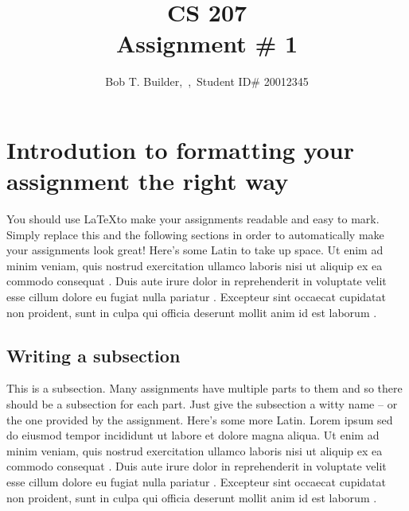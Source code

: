 \documentclass[journal,onecolumn]{IEEEtran}
\begin{document}


\newcommand{\course}{CS 207} %
\newcommand{\anum}{1} %
\newcommand{\name}{Bob T. Builder} %
\newcommand{\sid}{20012345} %


\title{\course{} \\ Assignment \# \anum{}}
\author{\name{},~\IEEEmembership{\course{},~University~of~Regina},~Student ID\# \sid{}}
\maketitle


\section{Introdution to formatting your assignment the right way}
You should use \LaTeX to make your assignments readable and easy to mark. Simply replace this and 
the following sections in order to automatically make your assignments look great! Here's some Latin to take up space. Ut enim ad minim veniam, quis nostrud exercitation ullamco laboris nisi ut aliquip ex ea commodo consequat \cite{kanto:kanto}. Duis aute irure dolor in reprehenderit in voluptate velit esse cillum dolore eu fugiat nulla pariatur \cite{monge:monge}. Excepteur sint occaecat cupidatat non proident, sunt in culpa qui officia deserunt mollit anim id est laborum \cite{web:web}.

\subsection{Writing a subsection}
This is a subsection. Many assignments have multiple parts to them and so there should be a subsection
for each part. Just give the subsection a witty name -- or the one provided by the assignment. Here's some more Latin. Lorem ipsum sed do eiusmod tempor incididunt ut labore et dolore magna aliqua. Ut enim ad minim veniam, quis nostrud exercitation ullamco laboris nisi ut aliquip ex ea commodo consequat \cite{kanto:kanto}. Duis aute irure dolor in reprehenderit in voluptate velit esse cillum dolore eu fugiat nulla pariatur \cite{monge:monge}. Excepteur sint occaecat cupidatat non proident, sunt in culpa qui officia deserunt mollit anim id est laborum \cite{web:web}.
\\
\end{document}

